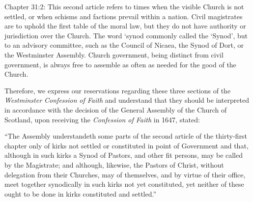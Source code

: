 \par Chapter 31:2: This second article refers to times when the visible Church is not settled, or when schisms and factions prevail within a nation. Civil magistrates are to uphold the first table of the moral law, but they do not have authority or jurisdiction over the Church. The word `synod commonly called the `Synod', but to an advisory committee, such as the Council of Nicaea, the Synod of Dort, or the Westminster Assembly. Church government, being distinct from civil government, is always free to assemble as often as needed for the good of the Church.

\par Therefore, we express our reservations regarding these three sections of the \textit{Westminster Confession}\textit{ of Faith} and understand that they should be interpreted in accordance with the decision of the General Assembly of the Church of Scotland, upon receiving the \textit{Confession of Faith} in 1647, stated:  

\par {``The Assembly} understandeth some parts of the second article of the thirty-first chapter only of kirks not settled or constituted in point of Government and that, although in such kirks a Synod of Pastors, and other fit persons, may be called by the Magistrate; and although, likewise, the Pastors of Christ, without delegation from their Churches, may of themselves, and by virtue of their office, meet together synodically in such kirks not yet constituted, yet neither of these ought to be done in kirks constituted and settled.''

